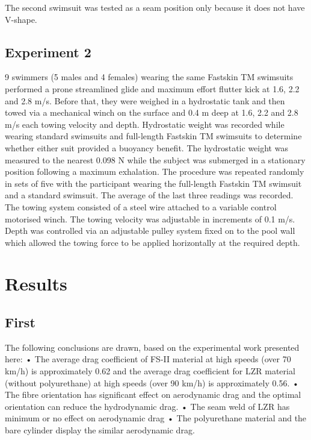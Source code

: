 \documentclass[twoside,twocolumn]{article}                          %
\begin{document}
The second swimsuit was tested as a seam position only because it does not have V-shape. 

\subsection{Experiment 2}
9 swimmers (5 males and 4 females) wearing the same Fastskin TM swimsuits performed a prone streamlined glide and maximum effort flutter kick at 1.6, 2.2 and 2.8 m/s. Before that, they were weighed in a hydrostatic tank and then towed via a mechanical winch on the surface and 0.4 m deep at 1.6, 2.2 and 2.8 m/s each towing velocity and depth. 
Hydrostatic weight was recorded while wearing standard swimsuits and full-length Fastskin TM swimsuits to determine whether either suit provided a buoyancy benefit. The hydrostatic weight was measured to the nearest 0.098 N while the subject was submerged in a stationary position following a maximum exhalation. The procedure was repeated randomly in sets of five with the participant wearing the full-length Fastskin TM swimsuit and a standard swimsuit. The average of the last three readings was recorded. The towing system consisted of a steel wire attached to a variable control motorised winch. The towing velocity was adjustable in increments of 0.1 m/s. Depth was controlled via an adjustable pulley system fixed on to the pool wall which allowed the towing force to be applied horizontally at the required depth. 



\section{Results}
\subsection{First}
The following conclusions are drawn, based on the experimental work presented here: • The average drag coefficient of FS-II material at high speeds (over 70 km/h) is approximately 0.62 and the average drag coefficient for LZR material (without polyurethane) at high speeds (over 90 km/h) is approximately 0.56. • The fibre orientation has significant effect on aerodynamic drag and the optimal orientation can reduce the hydrodynamic drag. • The seam weld of LZR has minimum or no effect on aerodynamic drag • The polyurethane material and the bare cylinder display the similar aerodynamic drag. 
\end{document}
